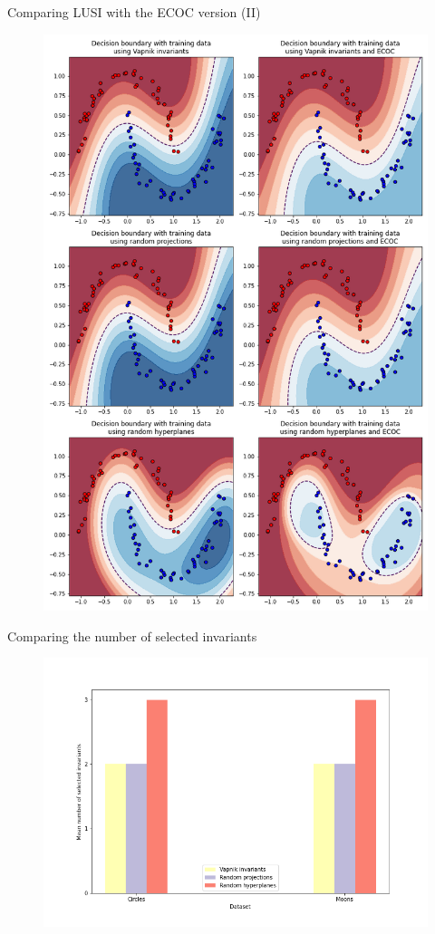 \documentclass[10pt, dvipsnames]{beamer}
\begin{document}
\begin{frame}{Comparing LUSI with the ECOC version (II)}
    \begin{figure}
        \centering
        \includegraphics[width=.5\textwidth]{presentation/figures/comparative_moons.png}
    \end{figure}
\end{frame}

\begin{frame}{Comparing the number of selected invariants}
    \begin{figure}
        \centering
        \includegraphics[width=\textwidth]{thesis/Figures/num_selected_invariants.png}
    \end{figure}
\end{frame}
\end{document}
